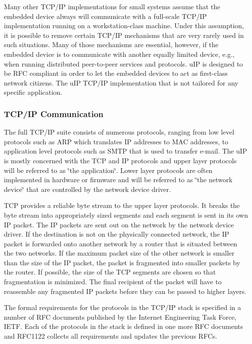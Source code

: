 \-Many other \-T\-C\-P/\-I\-P implementations for small systems assume that the embedded device always will communicate with a full-\/scale \-T\-C\-P/\-I\-P implementation running on a workstation-\/class machine. \-Under this assumption, it is possible to remove certain \-T\-C\-P/\-I\-P mechanisms that are very rarely used in such situations. \-Many of those mechanisms are essential, however, if the embedded device is to communicate with another equally limited device, e.\-g., when running distributed peer-\/to-\/peer services and protocols. u\-I\-P is designed to be \-R\-F\-C compliant in order to let the embedded devices to act as first-\/class network citizens. \-The u\-I\-P \-T\-C\-P/\-I\-P implementation that is not tailored for any specific application.\hypertarget{a00060_uip-tcpip}{}\subsubsection{\-T\-C\-P/\-I\-P Communication}\label{a00060_uip-tcpip}
\-The full \-T\-C\-P/\-I\-P suite consists of numerous protocols, ranging from low level protocols such as \-A\-R\-P which translates \-I\-P addresses to \-M\-A\-C addresses, to application level protocols such as \-S\-M\-T\-P that is used to transfer e-\/mail. \-The u\-I\-P is mostly concerned with the \-T\-C\-P and \-I\-P protocols and upper layer protocols will be referred to as \char`\"{}the
application\char`\"{}. \-Lower layer protocols are often implemented in hardware or firmware and will be referred to as \char`\"{}the network device\char`\"{} that are controlled by the network device driver.

\-T\-C\-P provides a reliable byte stream to the upper layer protocols. \-It breaks the byte stream into appropriately sized segments and each segment is sent in its own \-I\-P packet. \-The \-I\-P packets are sent out on the network by the network device driver. \-If the destination is not on the physically connected network, the \-I\-P packet is forwarded onto another network by a router that is situated between the two networks. \-If the maximum packet size of the other network is smaller than the size of the \-I\-P packet, the packet is fragmented into smaller packets by the router. \-If possible, the size of the \-T\-C\-P segments are chosen so that fragmentation is minimized. \-The final recipient of the packet will have to reassemble any fragmented \-I\-P packets before they can be passed to higher layers.

\-The formal requirements for the protocols in the \-T\-C\-P/\-I\-P stack is specified in a number of \-R\-F\-C documents published by the \-Internet \-Engineering \-Task \-Force, \-I\-E\-T\-F. \-Each of the protocols in the stack is defined in one more \-R\-F\-C documents and \-R\-F\-C1122 collects all requirements and updates the previous \-R\-F\-Cs.

